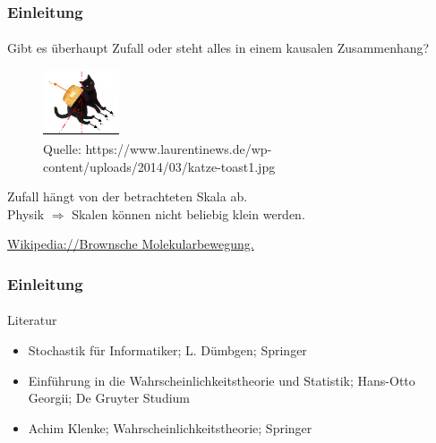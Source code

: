 \documentclass{beamer}
\begin{document}
\begin{frame}
    \frametitle{Einleitung}
\framesubtitle{}
\begin{block}{}
Gibt es überhaupt Zufall oder steht alles in einem kausalen Zusammenhang? 
\end{block}

\begin{figure}[htp]
      \centering
    \includegraphics[width=0.2\textwidth]{img/katze-toast}

      \caption{Quelle: https://www.laurentinews.de/wp-content/uploads/2014/03/katze-toast1.jpg}
\end{figure}

    \begin{block}{}
Zufall hängt von der betrachteten Skala ab. \\
Physik $\Rightarrow$ Skalen können nicht beliebig klein werden.
\end{block}
    \begin{block}{}
\href{https://de.wikipedia.org/wiki/Brownsche_Bewegung
}{Wikipedia://Brownsche Molekularbewegung.
}
\end{block}

\end{frame}



\begin{frame}
    \frametitle{Einleitung}
\framesubtitle{}

\begin{block}{Literatur}
\begin{itemize}
\item Stochastik für Informatiker; L. Dümbgen; Springer
\item Einführung in die Wahrscheinlichkeitstheorie und Statistik; Hans-Otto Georgii; De Gruyter Studium
\item Achim Klenke; Wahrscheinlichkeitstheorie; Springer
\end{itemize}
\end{block}


 \end{frame}
\end{document}
